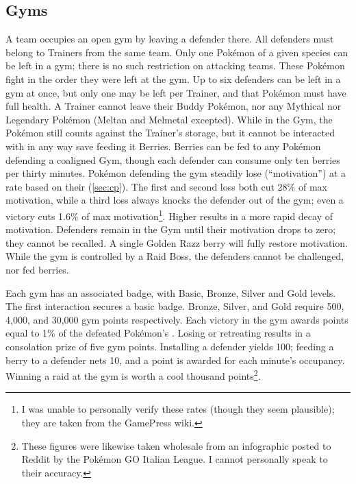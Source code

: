 \subsection{Gyms\label{sec:gyms}}
A team occupies an open gym by leaving a defender there.
All defenders must belong to Trainers from the same team.
Only one Pokémon of a given species can be left in a gym; there is no
  such restriction on attacking teams.
These Pokémon fight in the order they were left at the gym.
Up to six defenders can be left in a gym at once, but only one
  may be left per Trainer, and that Pokémon must have full health.
A Trainer cannot leave their Buddy Pokémon, nor any Mythical nor Legendary
  Pokémon (Meltan and Melmetal excepted).
While in the Gym, the Pokémon still counts against the Trainer's storage,
  but it cannot be interacted with in any way save feeding it Berries.
Berries can be fed to any Pokémon defending a coaligned Gym, though
  each defender can consume only ten berries per thirty minutes.
Pokémon defending the gym steadily lose \HP{} (``motivation'') at a rate
  based on their \CP{} (\autoref{sec:cp}).
The first and second loss both cut 28\% of max motivation, while
  a third loss always knocks the defender out of the gym;
  even a victory cuts 1.6\% of max motivation\footnote{I was unable to personally verify these rates (though they seem plausible); they are taken from the GamePress wiki.}.
Higher \CP{} results in a more rapid decay of motivation.
Defenders remain in the Gym until their motivation drops to zero; they cannot be recalled.
A single Golden Razz berry will fully restore motivation.
While the gym is controlled by a Raid Boss, the defenders cannot be challenged,
  nor fed berries.

Each gym has an associated badge, with Basic, Bronze, Silver and Gold levels.
The first interaction secures a basic badge.
Bronze, Silver, and Gold require 500, 4,000, and 30,000 gym points respectively.
Each victory in the gym awards points equal to 1\% of the defeated Pokémon's \CP\@.
Losing or retreating results in a consolation prize of five gym points.
Installing a defender yields 100; feeding a berry to a defender nets 10,
 and a point is awarded for each minute's occupancy.
Winning a raid at the gym is worth a cool thousand points\footnote{These figures were likewise taken wholesale from an
 infographic posted to Reddit by the Pokémon GO Italian League. I cannot personally speak to their accuracy.}.

